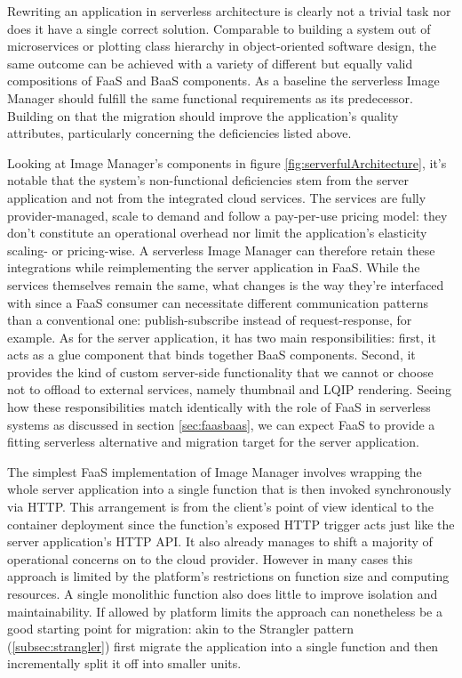 Rewriting an application in serverless architecture is clearly not a trivial task nor does it have a single correct solution. Comparable to building a system out of microservices or plotting class hierarchy in object-oriented software design, the same outcome can be achieved with a variety of different but equally valid compositions of FaaS and BaaS components. As a baseline the serverless Image Manager should fulfill the same functional requirements as its predecessor. Building on that the migration should improve the application's quality attributes, particularly concerning the deficiencies listed above.

Looking at Image Manager's components in figure \ref{fig:serverfulArchitecture}, it's notable that the system's non-functional deficiencies stem from the server application and not from the integrated cloud services. The services are fully provider-managed, scale to demand and follow a pay-per-use pricing model: they don't constitute an operational overhead nor limit the application's elasticity scaling- or pricing-wise. A serverless Image Manager can therefore retain these integrations while reimplementing the server application in FaaS. While the services themselves remain the same, what changes is the way they're interfaced with since a FaaS consumer can necessitate different communication patterns than a conventional one: publish-subscribe instead of request-response, for example. As for the server application, it has two main responsibilities: first, it acts as a glue component that binds together BaaS components. Second, it provides the kind of custom server-side functionality that we cannot or choose not to offload to external services, namely thumbnail and LQIP rendering. Seeing how these responsibilities match identically with the role of FaaS in serverless systems as discussed in section \ref{sec:faasbaas}, we can expect FaaS to provide a fitting serverless alternative and migration target for the server application.

The simplest FaaS implementation of Image Manager involves wrapping the whole server application into a single function that is then invoked synchronously via HTTP. This arrangement is from the client's point of view identical to the container deployment since the function's exposed HTTP trigger acts just like the server application's HTTP API. It also already manages to shift a majority of operational concerns on to the cloud provider. However in many cases this approach is limited by the platform's restrictions on function size and computing resources. A single monolithic function also does little to improve isolation and maintainability. If allowed by platform limits the approach can nonetheless be a good starting point for migration: akin to the Strangler pattern (\ref{subsec:strangler}) first migrate the application into a single function and then incrementally split it off into smaller units.

